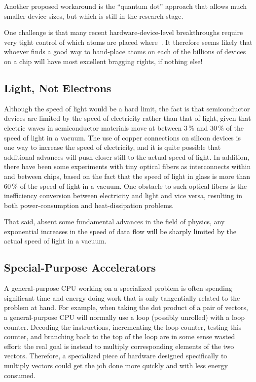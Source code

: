 Another proposed workaround is the ``quantum dot'' approach that
allows much smaller device sizes, but which is still in the research
stage.

One challenge is that many recent hardware-device-level breakthroughs
require very tight control of which atoms are placed
where~\cite{MichaelJKelly2017DeviceLevel}.
It therefore seems likely that whoever finds a good way to hand-place
atoms on each of the billions of devices on a chip will have most
excellent bragging rights, if nothing else!

\subsection{Light, Not Electrons}
\label{sec:cpu:Light, Not Electrons}

Although the speed of light would be a hard limit, the fact is that
semiconductor devices are limited by the speed of electricity rather
than that of light, given that electric waves in semiconductor materials
move at between 3\,\% and 30\,\% of the speed of light in a vacuum.
The use of copper connections on silicon devices is one way to increase
the speed of electricity, and it is quite possible that additional
advances will push closer still to the actual speed of light.
In addition, there have been some experiments with tiny optical fibers
as interconnects within and between chips, based on the fact that
the speed of light in glass is more than 60\,\% of the speed of light
in a vacuum.
One obstacle to such optical fibers is the inefficiency conversion
between electricity and light and vice versa, resulting in both
power-consumption and heat-dissipation problems.

That said, absent some fundamental advances in the field of physics,
any exponential increases in the speed of data flow
will be sharply limited by the actual speed of light in a vacuum.

\subsection{Special-Purpose Accelerators}
\label{sec:cpu:Special-Purpose Accelerators}

A general-purpose CPU working on a specialized problem is often spending
significant time and energy doing work that is only tangentially related
to the problem at hand.
For example, when taking the dot product of a pair of vectors, a
general-purpose CPU will normally use a loop (possibly unrolled)
with a loop counter.
Decoding the instructions, incrementing the loop counter, testing this
counter, and branching back to the
top of the loop are in some sense wasted effort: the real goal is
instead to multiply corresponding elements of the two vectors.
Therefore, a specialized piece of hardware designed specifically to
multiply vectors could get the job done more quickly and with less
energy consumed.

